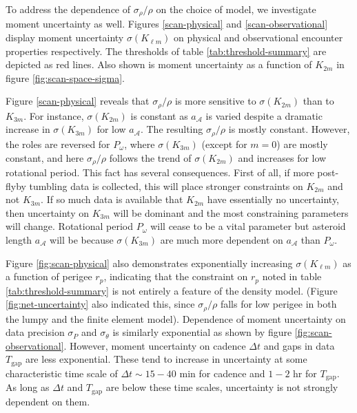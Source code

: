 \documentclass[fleqn,usenatbib]{mnras}
\begin{document}
To address the dependence of $\sigma_\rho / \rho$ on the choice of model, we investigate moment uncertainty as well. Figures \ref{scan-physical} and \ref{scan-observational} display moment uncertainty $\sigma(K_{\ell m})$ on physical and observational encounter properties respectively. The thresholds of table \ref{tab:threshold-summary} are depicted as red lines. Also shown is moment uncertainty as a function of $K_{2m}$ in figure \ref{fig:scan-space-sigma}.

Figure \ref{scan-physical} reveals that $\sigma_\rho / \rho$ is more sensitive to $\sigma (K_{2m})$ than to $K_{3m}$. For instance, $\sigma(K_{2m})$ is constant as $a_\mathcal{A}$ is varied despite a dramatic increase in $\sigma(K_{3m})$ for low $a_\mathcal{A}$. The resulting $\sigma_\rho / \rho$ is mostly constant. However, the roles are reversed for $P_\omega$, where $\sigma(K_{3m})$ (except for $m=0$) are mostly constant, and here $\sigma_\rho /\rho$ follows the trend of $\sigma(K_{2m})$ and increases for low rotational period. This fact has several consequences. First of all, if more post-flyby tumbling data is collected, this will place stronger constraints on $K_{2m}$ and not $K_{3m}$. If so much data is available that $K_{2m}$ have essentially no uncertainty, then uncertainty on $K_{3m}$ will be dominant and the most constraining parameters will change. Rotational period $P_\omega$ will cease to be a vital parameter but asteroid length $a_\mathcal{A}$ will be because $\sigma(K_{3m})$ are much more dependent on $a_\mathcal{A}$ than $P_\omega$.

Figure \ref{fig:scan-physical} also demonstrates exponentially increasing $\sigma(K_{\ell m})$ as a function of perigee $r_p$, indicating that the constraint on $r_p$ noted in table \ref{tab:threshold-summary} is not entirely a feature of the density model. (Figure \ref{fig:net-uncertainty} also indicated this, since $\sigma_\rho / \rho$ falls for low perigee in both the lumpy and the finite element model). Dependence of moment uncertainty on data precision $\sigma_P$ and $\sigma_\theta$ is similarly exponential as shown by figure \ref{fig:scan-observational}. However, moment uncertainty on cadence $\Delta t$ and gaps in data $T_\text{gap}$ are less exponential. These tend to increase in uncertainty at some characteristic time scale of $\Delta t \sim 15 -40$ min for cadence and $1-2$ hr for $T_\text{gap}$. As long as $\Delta t$ and $T_\text{gap}$ are below these time scales, uncertainty is not strongly dependent on them.
\end{document}
